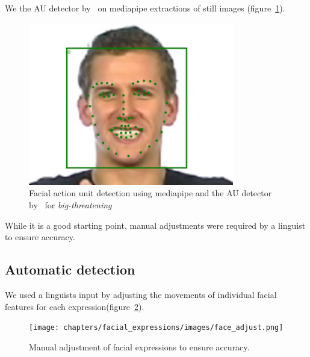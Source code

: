 \documentclass[../../main]{subfiles}
\begin{document}
We the AU detector by~\cite{luo2022learning} on mediapipe extractions of still images (figure~\ref{ch:facial_expressions:fig:face_detect}).

\begin{figure}
    \centering
    \includegraphics[width=0.8\textwidth]{chapters/facial_expressions/images/face_detect.png}
    \caption{Facial action unit detection using mediapipe and the AU detector by~\cite{luo2022learning} for \emph{big-threatening}}
    \label{ch:facial_expressions:fig:face_detect}
\end{figure}

While it is a good starting point, manual adjustments were required by a linguist to ensure accuracy.

\subsection{Automatic detection}
\label{ch:facial_expressions:action_unit_analysis:automatic_detection}

We used a linguists input by adjusting the movements of individual facial features for each expression(figure~\ref{ch:facial_expressions:fig:face_adjust}).

\begin{figure}
    \centering
    \texttt{[image: chapters/facial\_expressions/images/face\_adjust.png]}
    \caption{Manual adjustment of facial expressions to ensure accuracy.}
    \label{ch:facial_expressions:fig:face_adjust}
\end{figure}
\end{document}

